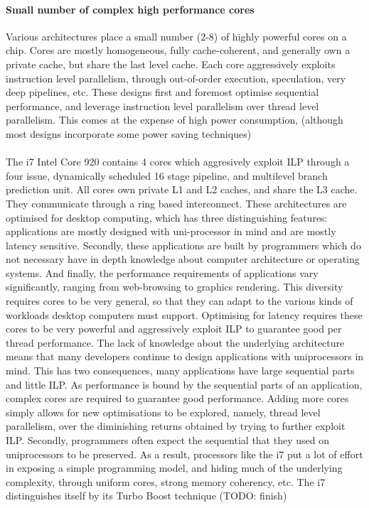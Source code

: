 \paragraph{Small number of complex high performance cores}
Various architectures place a small number (2-8) of highly
powerful cores on a chip.  Cores are mostly homogeneous, fully cache-coherent,
and generally own a private cache, but share the last level cache. 
Each core aggressively exploits instruction level parallelism, through
out-of-order execution, speculation, very deep pipelines, etc. 
These designs first and foremost optimise sequential performance, 
and leverage instruction level parallelism over thread level parallelism. 
This comes at the expense of high power consumption, 
(although most designs incorporate some power
saving techniques)
\paragraph{} The i7 Intel Core 920 contains 4 cores which aggresively
exploit ILP through a four issue,  dynamically scheduled 16 stage pipeline,
and multilevel branch prediction unit. All cores own
 private L1 and L2 caches, and share the L3 cache. They communicate
through a ring based interconnect. These architectures are
optimised for desktop computing, which has three distinguishing features:
applications are mostly designed with uni-processor in mind and are 
mostly latency sensitive. Secondly, these applications are built by 
programmers which do not necessary have in depth knowledge about computer
 architecture or operating systems. And finally, the performance requirements
of applications vary significantly, ranging from web-browsing
to graphics rendering.  This diversity requires cores to be very general,
so that they can adapt to the various kinds of workloads desktop computers
must support. Optimising for latency requires these cores to be very powerful 
and aggressively exploit ILP to guarantee good per
thread performance. The lack of knowledge about the underlying architecture
means that many developers continue to design applications with uniprocessors
in mind. This has two consequences, many applications have large sequential parts and 
little ILP. As performance is bound by the sequential parts of an application, 
complex cores are required to guarantee good performance. 
Adding more cores simply allows for new optimisations to be explored, namely, 
thread level parallelism, over the diminishing returns obtained by trying
to further exploit ILP.  Secondly, programmers often expect the 
sequential that they used on uniprocessors to be preserved. 
As a result, processors like the i7 put a lot of effort in exposing
a simple programming model, and hiding much of the underlying complexity, through
uniform cores, strong memory coherency, etc. 
The i7 distinguishes itself by its Turbo Boost technique (TODO: finish)


